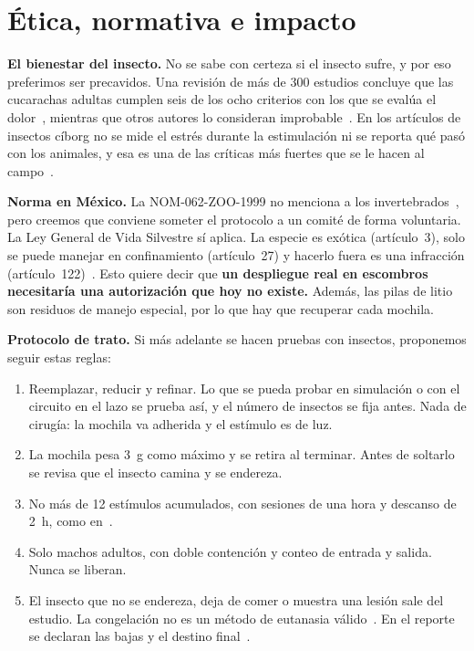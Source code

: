 \section{Ética, normativa e impacto}
\label{sec:etica}

\textbf{El bienestar del insecto.} No se sabe con certeza si el insecto sufre, y por eso preferimos ser precavidos. Una
revisión de más de 300 estudios concluye que las cucarachas adultas cumplen seis de los ocho criterios con los que se evalúa
el dolor~\cite{gibbons2022,crump2023}, mientras que otros autores lo consideran improbable~\cite{adamo2016}. En los artículos
de insectos cíborg no se mide el estrés durante la estimulación ni se reporta qué pasó con los animales, y esa es una de las
críticas más fuertes que se le hacen al campo~\cite{dodd2014,mestre2024}.

\textbf{Norma en México.} La NOM-062-ZOO-1999 no menciona a los invertebrados~\cite{nom062}, pero creemos que conviene someter
el protocolo a un comité de forma voluntaria. La Ley General de Vida Silvestre sí aplica. La especie es exótica
(artículo~3), solo se puede manejar en confinamiento (artículo~27) y hacerlo fuera es una infracción
(artículo~122)~\cite{lgvs}. Esto quiere decir que \textbf{un despliegue real en escombros necesitaría una autorización que
hoy no existe.} Además, las pilas de litio son residuos de manejo especial, por lo que hay que recuperar cada mochila.

\textbf{Protocolo de trato.} Si más adelante se hacen pruebas con insectos, proponemos seguir estas reglas:
\begin{enumerate}
  \item Reemplazar, reducir y refinar. Lo que se pueda probar en simulación o con el circuito en el lazo se prueba así, y el número de
        insectos se fija antes. Nada de cirugía: la mochila va adherida y el estímulo es de luz.
  \item La mochila pesa 3~g como máximo y se retira al terminar. Antes de soltarlo se revisa que el insecto camina y se endereza.
  \item No más de 12 estímulos acumulados, con sesiones de una hora y descanso de 2~h, como en~\cite{gracidas2026}.
  \item Solo machos adultos, con doble contención y conteo de entrada y salida. Nunca se liberan.
  \item El insecto que no se endereza, deja de comer o muestra una lesión sale del estudio. La congelación no es un método de eutanasia
        válido~\cite{tucker2023}. En el reporte se declaran las bajas y el destino final~\cite{fischer2024}.
\end{enumerate}

